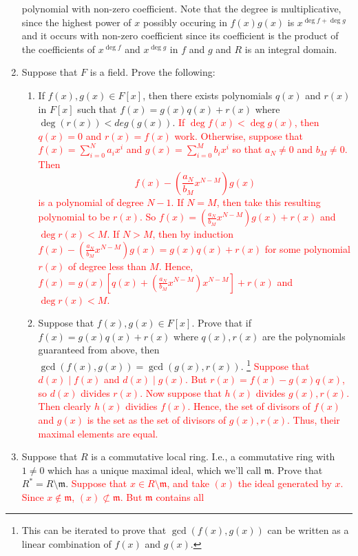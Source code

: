 \documentclass[12pt]{article}
\newcommand{\solution}[1]{\textcolor{red}{#1}}
\begin{document}
\begin{enumerate}
{polynomial with non-zero coefficient. Note that the degree is
multiplicative, since the highest power of $x$ possibly occuring in $f(x)g(x)$
is $x^{\deg f+\deg g}$ and it occurs with non-zero coefficient since
its coefficient is the product of the coefficients of $x^{\deg f}$ and
$x^{\deg g}$ in $f$ and $g$ and $R$ is an integral domain. 
}
\item Suppose that $F$ is a field. Prove the following:
  \begin{enumerate}
  \item If $f(x),g(x)\in F[x]$, then there exists polynomials $q(x)$
    and $r(x)$ in $F[x]$ such that $f(x)=g(x)q(x)+r(x)$ where
    $\deg(r(x))<deg(g(x))$. 
\solution{
If $\deg f(x)<\deg g(x)$, then $q(x)=0$ and $r(x)=f(x)$
work. Otherwise, suppose that $f(x)=\sum\limits_{i=0}^N a_i x^i$ and
$g(x)=\sum\limits_{i=0}^M b_i x^i$ so that $a_N\neq 0$ and $b_M\neq
0$.  Then
\[f(x)-\left(\frac{a_N}{b_M}x^{N-M}\right) g(x)\] is a polynomial of
degree $N-1$. If $N=M$, then take this resulting polynomial to be
$r(x)$. So $f(x)=\left(\frac{a_N}{b_M}x^{N-M}\right) g(x)+r(x)$ and
$\deg r(x)<M$. If $N>M$, then by induction
$f(x)-\left(\frac{a_N}{b_M}x^{N-M}\right) g(x)=g(x)q(x)+r(x)$ for some
polynomial $r(x)$ of degree less than $M$. Hence, $f(x) =
g(x)\left[q(x)+\left(\frac{a_N}{b_M}x^{N-M}\right)x^{N-M}\right]+r(x)$
and $\deg r(x)<M$. 
}
  \item Suppose that $f(x),g(x)\in F[x]$. Prove that if
    $f(x)=g(x)q(x)+r(x)$ where $q(x),r(x)$ are the polynomials
    guaranteed from above, then
    $\gcd(f(x),g(x))=\gcd(g(x),r(x))$. \footnote{This can be iterated
      to prove that $\gcd(f(x),g(x))$ can be written as a linear
      combination of $f(x)$ and $g(x)$. }
\solution{Suppose that $d(x) \mid f(x)$ and $d(x)\mid g(x)$. But
  $r(x)=f(x)-g(x)q(x)$, so $d(x)$ divides $r(x)$. Now suppose that
  $h(x)$ divides $g(x), r(x)$. Then clearly $h(x)$ dividies
  $f(x)$. Hence, the set of divisors of $f(x)$ and $g(x)$ is the set
  as the set of divisors of $g(x),r(x)$. Thus, their maximal elements
  are equal.
}
  \end{enumerate}
\item Suppose that $R$ is a commutative local ring. I.e., a
  commutative ring with
  $1\neq 0$ which
  has a unique maximal ideal, which we'll call $\mathfrak{m}$. Prove
  that $R^* = R\setminus \mathfrak{m}$. 
\solution{Suppose that $x\in R\setminus \mathfrak{m}$, and take $(x)$
  the ideal generated by $x$. Since $x\notin \mathfrak{m}$,
  $(x)\not\subset \mathfrak{m}$. But $\mathfrak{m}$ contains all
}
\end{enumerate}
\end{document}
